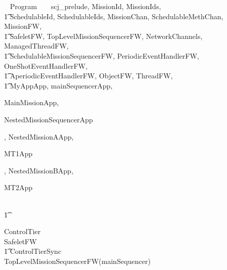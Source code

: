
%
\begin{zsection}
  \SECTION ~ Program ~ \parents ~ scj\_prelude, MissionId, MissionIds, \\
  \t1 SchedulableId, SchedulableIds, MissionChan, SchedulableMethChan, MissionFW,\\
  \t1 SafeletFW, TopLevelMissionSequencerFW, NetworkChannels, ManagedThreadFW, \\
  \t1 SchedulableMissionSequencerFW, PeriodicEventHandlerFW, OneShotEventHandlerFW,\\
  \t1 AperiodicEventHandlerFW, ObjectFW, ThreadFW, \\
  \t1 MyAppApp, mainSequencerApp,

MainMissionApp,

NestedMissionSequencerApp
	
	
	,
NestedMissionAApp,

MT1App
	
	,
NestedMissionBApp,

MT2App
	
\\ \t1
	
	
\end{zsection}
%
\begin{circus}
\circprocess ControlTier \circdef \\
\circblockopen
SafeletFW \\
\t1 \lpar ControlTierSync \rpar \\
TopLevelMissionSequencerFW(mainSequencer)
\circblockclose
\end{circus}
%


